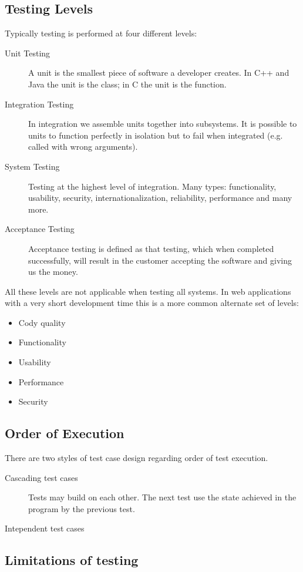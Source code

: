 \documentclass[a4paper]{article}
\begin{document}
\subsection{Testing Levels}
Typically testing is performed at four different levels:
\begin{description}
  \item[Unit Testing] A unit is the smallest piece of software a developer
    creates. In C++ and Java the unit is the class; in C the unit is the
    function.
  \item[Integration Testing]  In integration we assemble units together into
    subsystems. It is possible to units to function perfectly in isolation but
    to fail when integrated (e.g. called with wrong arguments).
  \item[System Testing] Testing at the highest level of integration. Many types:
    functionality, usability, security, internationalization, reliability,
    performance and many more.
  \item[Acceptance Testing] Acceptance testing is defined as that testing, which
    when completed successfully, will result in the customer accepting the
    software and giving us the money.
\end{description}
All these levels are not applicable when testing all systems. In web
applications with a very short development time this is a more common alternate
set of levels:
\begin{itemize}
  \item Cody quality
  \item Functionality
  \item Usability
  \item Performance
  \item Security
\end{itemize}

\subsection{Order of Execution}
There are two styles of test case design regarding order of test execution.
\begin{description}
  \item[Cascading test cases] Tests may build on each other. The next test use
    the state achieved in the program by the previous test.
  \item[Intependent test cases]
\end{description}
\subsection{Limitations of testing}
\label{sec:limitations of testing}
\end{document}

